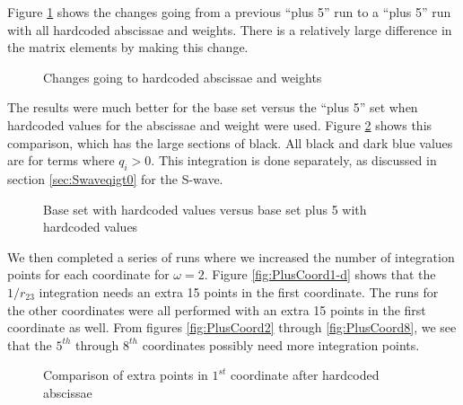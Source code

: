 \documentclass[Dissertation.tex]{subfiles}
\begin{document}
Figure \ref{fig:Base5vsBase5hardcoderound} shows the changes going from a previous ``plus 5'' run to a ``plus 5'' run with all hardcoded abscissae and weights. There is a relatively large difference in the matrix elements by making this change.
\begin{figure}
	\centering
	\caption{Changes going to hardcoded abscissae and weights}
	\label{fig:Base5vsBase5hardcoderound}
\end{figure}

The results were much better for the base set versus the ``plus 5'' set when hardcoded values for the abscissae and weight were used. Figure \ref{fig:BasehardcodevsBase5hardcode} shows this comparison, which has the large sections of black. All black and dark blue values are for terms where $q_i > 0$. This integration is done separately, as discussed in section \ref{sec:Swaveqigt0} for the S-wave.
\begin{figure}
	\centering
	\caption[Base set with hardcoded values vs. base set plus 5 with hardcoded values]{Base set with hardcoded values versus base set plus 5 with hardcoded values}
	\label{fig:BasehardcodevsBase5hardcode}
\end{figure}

We then completed a series of runs where we increased the number of integration points for each coordinate for $\omega = 2$. Figure \ref{fig:PlusCoord1-d} shows that the $1/r_{23}$ integration needs an extra 15 points in the first coordinate. The runs for the other coordinates were all performed with an extra 15 points in the first coordinate as well. From figures \ref{fig:PlusCoord2} through \ref{fig:PlusCoord8}, we see that the $5^{th}$ through $8^{th}$ coordinates possibly need more integration points.

\begin{figure}
\centering
{}
\caption{Comparison of extra points in $1^{st}$ coordinate after hardcoded abscissae}
\label{fig:PlusCoord1}
\end{figure}
\end{document}
